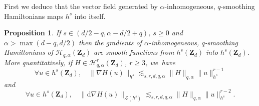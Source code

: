 \documentclass[11pt]{article}
\newtheorem{proposition}[theorem]{Proposition}
\theoremstyle{definition}
\begin{document}
First we deduce that the vector field generated by $\alpha$-inhomogeneous, $q$-smoothing Hamiltonians maps $h^s$ into itself.
\begin{proposition}
\label{prop_vf}
If $s\in (d/2-q, \alpha-d/2+q)$, $s\geq 0$ and $\alpha >\max(d-q,d/2)$ then the gradients of $\alpha$-inhomogeneous, $q$-smoothing Hamiltonians of $ \mathscr{H}_{q,\alpha}(\mathbf{Z}_d)$ are smooth functions from $h^s(\mathbf{Z}_d)$ into $h^s(\mathbf{Z}_d)$. More quantitatively, if $H\in \mathscr{H}_{q,\alpha}^r(\mathbf{Z}_d)$, $r\geq 3$, we~have
\begin{equation}
\label{eq_cont_X}
\forall u \in h^s(\mathbf{Z}_d), \quad \|\nabla H(u)\|_{h^s} \lesssim_{s,r,d,q,\alpha} \| H \|_{q,\alpha} \|u\|_{h^s}^{r-1}
\end{equation}
and
\begin{equation}
\label{eq_cont_dX}
\forall u \in h^s(\mathbf{Z}_d), \quad \| \mathrm{d} \nabla H(u)\|_{\mathscr{L}(h^s)} \lesssim_{s,r,d,q,\alpha} \| H \|_{q,\alpha} \|u\|_{h^s}^{r-2}.
\end{equation}
\end{proposition}
\end{document}
